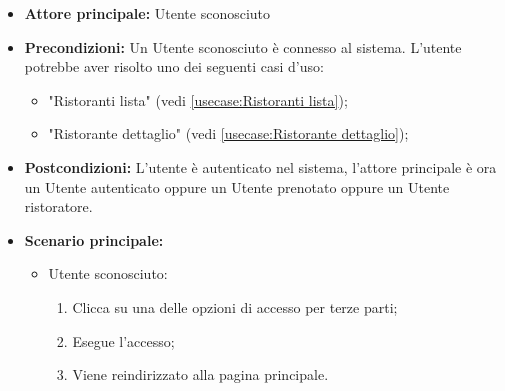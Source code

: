 \label{usecase:Accesso}
\begin{itemize}
	\item \textbf{Attore principale:} Utente sconosciuto
	\item \textbf{Precondizioni:}
	      Un Utente sconosciuto è connesso al sistema.
	      L'utente potrebbe aver risolto uno dei seguenti casi d'uso:
	      \begin{itemize}
		      \item "Ristoranti lista" (vedi \autoref{usecase:Ristoranti lista});
		      \item "Ristorante dettaglio" (vedi \autoref{usecase:Ristorante dettaglio});
	      \end{itemize}
	\item \textbf{Postcondizioni:}
	      L'utente è autenticato nel sistema, l'attore principale è ora un Utente
	      autenticato oppure un Utente prenotato oppure un Utente
	      ristoratore.
	\item \textbf{Scenario principale:}
	      \begin{itemize}
		      \item Utente sconosciuto:
		            \begin{enumerate}
			            \item Clicca su una delle opzioni di accesso per terze
			                  parti;
			            \item Esegue l'accesso;
			            \item Viene reindirizzato alla pagina principale.
		            \end{enumerate}
	      \end{itemize}

\end{itemize}
